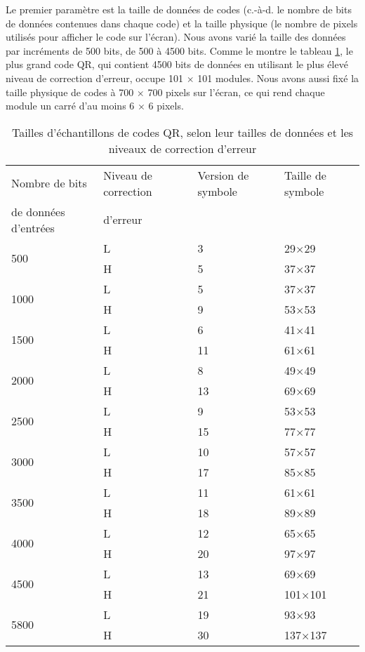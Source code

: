 Le premier paramètre est la taille de données de codes (c.-à-d. le nombre de bits de données contenues dans chaque code) et la taille physique (le nombre de pixels utilisés pour afficher le code sur l'écran). Nous avons varié la taille des données par incréments de 500 bits, de 500 à 4500 bits. Comme le montre le tableau \ref{tab:qr:sample-sizes}, le plus grand code QR, qui contient 4500 bits de données en utilisant le plus élevé niveau de correction d'erreur, occupe 101 $\times$ 101 modules. Nous avons aussi fixé la taille physique de codes à 700 $\times$ 700 pixels sur l'écran, ce qui rend chaque module un carré d'au moins 6 $\times$ 6 pixels.

\begin{table}[ht]
\begin{center}
\begin{tabular}{llll}
Nombre de bits & Niveau de correction & Version de symbole & Taille de symbole \\
de données d'entrées & d'erreur & & \\
\hline
\multirow{2}{*}{500} & L & 3 & 29$\times$29\\
& H & 5 & 37$\times$37\\
\hline
\multirow{2}{*}{1000} & L & 5 & 37$\times$37\\
& H & 9 & 53$\times$53\\
\hline
\multirow{2}{*}{1500} & L & 6 & 41$\times$41\\
& H & 11 & 61$\times$61\\
\hline
\multirow{2}{*}{2000} & L & 8 & 49$\times$49\\
& H & 13 & 69$\times$69\\
\hline
\multirow{2}{*}{2500} & L & 9 & 53$\times$53\\
& H & 15 & 77$\times$77\\
\hline
\multirow{2}{*}{3000} & L & 10 & 57$\times$57\\
& H & 17 & 85$\times$85\\
\hline
\multirow{2}{*}{3500} & L & 11 & 61$\times$61\\
& H & 18 & 89$\times$89\\
\hline
\multirow{2}{*}{4000} & L & 12 & 65$\times$65\\
& H & 20 & 97$\times$97\\
\hline
\multirow{2}{*}{4500} & L & 13 & 69$\times$69\\
& H & 21 & 101$\times$101\\
\hline
\multirow{2}{*}{5800} & L & 19 & 93$\times$93\\
& H & 30 & 137$\times$137\\
\hline\end{tabular}
\caption[Tailles d'échantillons]{Tailles d'échantillons de codes QR, selon leur tailles de données et les niveaux de correction d'erreur \citep{iso18004}}
\label{tab:qr:sample-sizes}
\end{center}
\end{table}

